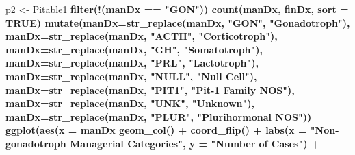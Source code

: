 \documentclass[]{book}
\newenvironment{Shaded}{\begin{snugshade}}{\end{snugshade}}
\newcommand{\DataTypeTok}[1]{\textcolor[rgb]{0.13,0.29,0.53}{#1}}
\newcommand{\KeywordTok}[1]{\textcolor[rgb]{0.13,0.29,0.53}{\textbf{#1}}}
\newcommand{\NormalTok}[1]{#1}
\newcommand{\OperatorTok}[1]{\textcolor[rgb]{0.81,0.36,0.00}{\textbf{#1}}}
\newcommand{\OtherTok}[1]{\textcolor[rgb]{0.56,0.35,0.01}{#1}}
\newcommand{\StringTok}[1]{\textcolor[rgb]{0.31,0.60,0.02}{#1}}
\begin{document}
\begin{Shaded}
\begin{Highlighting}[]
\NormalTok{p2 <-}\StringTok{ }\NormalTok{Pitable1 }\OperatorTok{%
\StringTok{  }\KeywordTok{filter}\NormalTok{(}\OperatorTok{!}\NormalTok{(manDx }\OperatorTok{==}\StringTok{ "GON"}\NormalTok{)) }\OperatorTok{%
\StringTok{  }\KeywordTok{count}\NormalTok{(manDx, finDx, }\DataTypeTok{sort =} \OtherTok{TRUE}\NormalTok{) }\OperatorTok{%
\StringTok{  }\KeywordTok{mutate}\NormalTok{(}\DataTypeTok{manDx=}\KeywordTok{str_replace}\NormalTok{(manDx, }\StringTok{"GON"}\NormalTok{, }\StringTok{"Gonadotroph"}\NormalTok{),}
         \DataTypeTok{manDx=}\KeywordTok{str_replace}\NormalTok{(manDx, }\StringTok{"ACTH"}\NormalTok{, }\StringTok{"Corticotroph"}\NormalTok{),}
         \DataTypeTok{manDx=}\KeywordTok{str_replace}\NormalTok{(manDx, }\StringTok{"GH"}\NormalTok{, }\StringTok{"Somatotroph"}\NormalTok{),}
         \DataTypeTok{manDx=}\KeywordTok{str_replace}\NormalTok{(manDx, }\StringTok{"PRL"}\NormalTok{, }\StringTok{"Lactotroph"}\NormalTok{),}
         \DataTypeTok{manDx=}\KeywordTok{str_replace}\NormalTok{(manDx, }\StringTok{"NULL"}\NormalTok{, }\StringTok{"Null Cell"}\NormalTok{),}
         \DataTypeTok{manDx=}\KeywordTok{str_replace}\NormalTok{(manDx, }\StringTok{"PIT1"}\NormalTok{, }\StringTok{"Pit-1 Family NOS"}\NormalTok{),}
         \DataTypeTok{manDx=}\KeywordTok{str_replace}\NormalTok{(manDx, }\StringTok{"UNK"}\NormalTok{, }\StringTok{"Unknown"}\NormalTok{),}
         \DataTypeTok{manDx=}\KeywordTok{str_replace}\NormalTok{(manDx, }\StringTok{"PLUR"}\NormalTok{, }\StringTok{"Plurihormonal NOS"}\NormalTok{)) }\OperatorTok{%
\StringTok{  }\KeywordTok{ggplot}\NormalTok{(}\KeywordTok{aes}\NormalTok{(}\DataTypeTok{x =}\NormalTok{ manDx }\OperatorTok{%
\StringTok{  }\KeywordTok{geom_col}\NormalTok{() }\OperatorTok{+}\StringTok{ }
\StringTok{  }\KeywordTok{coord_flip}\NormalTok{() }\OperatorTok{+}\StringTok{ }
\StringTok{  }\KeywordTok{labs}\NormalTok{(}\DataTypeTok{x =} \StringTok{"Non-gonadotroph Managerial Categories"}\NormalTok{, }
       \DataTypeTok{y =} \StringTok{"Number of Cases"}\NormalTok{) }\OperatorTok{+}
}}}}}
\end{Highlighting}
\end{Shaded}
\end{document}

